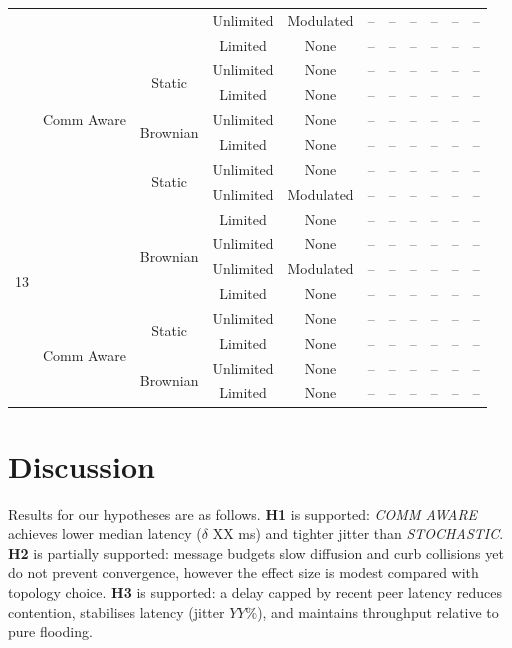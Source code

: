 \documentclass[conference]{IEEEtran}
\begin{document}
\begin{table}[ht]
\begin{tabular}{c|c|c|c|c|c|c|c|c|c|c}
  &   &          & Unlimited & Modulated & -- & -- & -- & -- & -- & -- \\
  &   &          & Limited   & None      & -- & -- & -- & -- & -- & -- \\
  \cmidrule{2-11}
  & \multirow{5}{*}{Comm Aware}
    & \multirow{2}{*}{Static}
                 & Unlimited & None      & -- & -- & -- & -- & -- & -- \\
  &   &          & Limited   & None      & -- & -- & -- & -- & -- & -- \\
  \cmidrule{3-11}
  &   & \multirow{2}{*}{Brownian}
                 & Unlimited & None      & -- & -- & -- & -- & -- & -- \\
  &   &          & Limited   & None      & -- & -- & -- & -- & -- & -- \\
\midrule
\multirow{10}{*}{13}
  & \multirow{5}{*}{Stochastic}
    & \multirow{2}{*}{Static}
                 & Unlimited & None      & -- & -- & -- & -- & -- & -- \\
  &   &          & Unlimited & Modulated & -- & -- & -- & -- & -- & -- \\
  &   &          & Limited   & None      & -- & -- & -- & -- & -- & -- \\
  \cmidrule{3-11}
  &   & \multirow{2}{*}{Brownian}
                 & Unlimited & None      & -- & -- & -- & -- & -- & -- \\
  &   &          & Unlimited & Modulated & -- & -- & -- & -- & -- & -- \\
  &   &          & Limited   & None      & -- & -- & -- & -- & -- & -- \\
  \cmidrule{2-11}
  & \multirow{5}{*}{Comm Aware}
    & \multirow{2}{*}{Static}
                 & Unlimited & None      & -- & -- & -- & -- & -- & -- \\
  &   &          & Limited   & None      & -- & -- & -- & -- & -- & -- \\
  \cmidrule{3-11}
  &   & \multirow{2}{*}{Brownian}
                 & Unlimited & None      & -- & -- & -- & -- & -- & -- \\
  &   &          & Limited   & None      & -- & -- & -- & -- & -- & -- \\
\bottomrule
\end{tabular}
\end{table}


\section{Discussion}\label{sec:discussion}
Results for our hypotheses are as follows. \textbf{H1} is supported: \emph{COMM AWARE} achieves lower median latency ($\delta$ XX ms) and tighter jitter than \emph{STOCHASTIC}. \textbf{H2} is partially supported: message budgets slow diffusion and curb collisions yet do not prevent convergence, however the effect size is modest compared with topology choice. \textbf{H3} is supported: a delay capped by recent peer latency reduces contention, stabilises latency (jitter $YY\%$), and maintains throughput relative to pure flooding.\\
\end{document}
